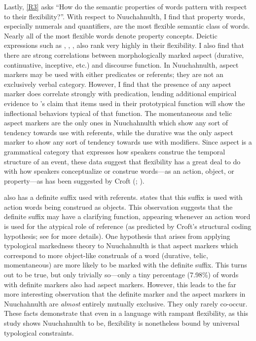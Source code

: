Lastly, \ref{R3} asks \enquote{How do the semantic properties of words pattern with respect to their flexibility?}. With respect to Nuuchahnulth, I find that property words, especially numerals and quantifiers, are the most flexible semantic class of words. Nearly all of the most flexible words denote property concepts. Deictic expressions such as , , ,  also rank very highly in their flexibility. I also find that there are strong correlations between morphologically marked aspect (durative, continuative, inceptive, etc.) and discourse function. In Nuuchahnulth, aspect markers may be used with either predicates or referents; they are not an exclusively verbal category. However, I find that the presence of any aspect marker does correlate strongly with predication, lending additional empirical evidence to \citeauthor{HopperThompson1984}'s \parencite*{HopperThompson1984} claim that items used in their prototypical function will show the inflectional behaviors typical of that function. The momentaneous and telic aspect markers are the only ones in Nuuchahnulth which show any sort of tendency towards use with referents, while the durative was the only aspect marker to show any sort of tendency towards use with modifiers. Since aspect is a grammatical category that expresses how speakers construe the temporal structure of an event, these data suggest that flexibility has a great deal to do with how speakers conceptualize or construe words—as an action, object, or property—as has been suggested by Croft (\citeyear[99]{Croft1991}; \citeyear[104]{Croft2001b}).

 also has a definite suffix  used with referents. \textcite[48]{Nakayama2001} states that this suffix is used with action words being construed as objects. This observation suggests that the definite suffix may have a clarifying function, appearing whenever an action word is used for the atypical role of reference (as predicted by Croft's structural coding hypothesis; see  for more details). One hypothesis that arises from applying typological markedness theory to Nuuchahnulth is that aspect markers which correspond to more object-like construals of a word (durative, telic, momentaneous) are more likely to be marked with the definite suffix. This turns out to be true, but only trivially so—only a tiny percentage (7.98\%) of words with definite markers also had aspect markers. However, this leads to the far more interesting observation that the definite marker and the aspect markers in Nuuchahnulth are \emph{almost} entirely mutually exclusive. They only rarely co-occur. These facts demonstrate that even in a language with rampant flexibility, as this study shows Nuuchahnulth to be, flexibility is nonetheless bound by universal typological constraints.

